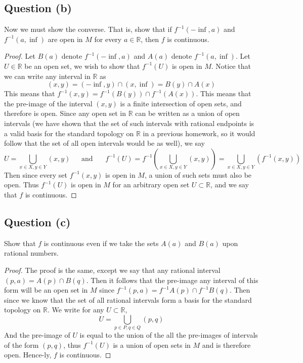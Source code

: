 \documentclass{article}
\begin{document}
    \subsection*{Question (b)}
        Now we must show the converse. That is, show that if $f^{-1}(-\inf, a)$ and $f^{-1}(a, \inf)$ are open in $M$
        for every $a \in \mathbb{R}$, then $f$ is continuous.
        \begin{proof}
            Let $B(a)$ denote $f^{-1}(-\inf, a)$ and $A(a)$ denote $f^{-1}(a, \inf)$. Let $U \in \mathbb{R}$ be
            an open set, we wish to show that $f^{-1}(U)$ is open in $M$. Notice that we can write any interval in $\mathbb{R}$
            as
            \[
                (x,y) = (-\inf, y) \cap (x, \inf) = B(y) \cap A(x)
            \]
            This means that $f^{-1}(x,y) = f^{-1}(B(y)) \cap f^{-1}(A(x))$. This means that the pre-image
            of the interval $(x,y)$ is a finite intersection of open sets, and therefore is open. Since any
            open set in $\mathbb{R}$ can be written as a union of open intervals (we have shown that the set
            of such intervals with rational endpoints is a valid basis for the standard topology on $\mathbb{R}$ in a previous homework,
            so it would follow that the set of all open intervals would be as well), we say
            \[
                U = \bigcup_{x \in X, y \in Y} (x, y) \ \ \ \ \ \ \ \text{and} \ \ \ \ \ \ \ \ f^{-1}(U) = f^{-1}\left(\bigcup_{x \in X, y \in Y}(x,y)\right) = \bigcup_{x \in X, y \in Y} (f^{-1}(x,y))
            \]
            Then since every set $f^{-1}(x,y)$ is open in $M$, a union of such sets must also be open. Thus
            $f^{-1}(U)$ is open in $M$ for an arbitrary open set $U \subset \mathbb{R}$, and we say that $f$ is continuous.
        \end{proof}
    \subsection*{Question (c)}
        Show that $f$ is continuous even if we take the sets $A(a)$ and $B(a)$ upon rational numbers.
        \begin{proof}
            The proof is the same, except we say that any rational interval $(p,a) = A(p) \cap B(q)$. Then it follows
            that the pre-image any interval of this form will be an open set in $M$ since $f^{-1}(p,a) = f^{-1}A(p) \cap f^{-1}B(q)$.
            Then since we know
            that the set of all rational intervals form a basis for the standard topology on $\mathbb{R}$. We write
            for any $U \subset \mathbb{R}$,
            \[
                U = \bigcup_{p \in P, q \in Q}(p,q)
            \]
            And the pre-image of $U$ is equal to the union of the all the pre-images of intervals of the form $(p,q)$,
            thus $f^{-1}(U)$ is a union of open sets in $M$ and is therefore open. Hence-ly, $f$ is continuous.
        \end{proof}
\end{document}
